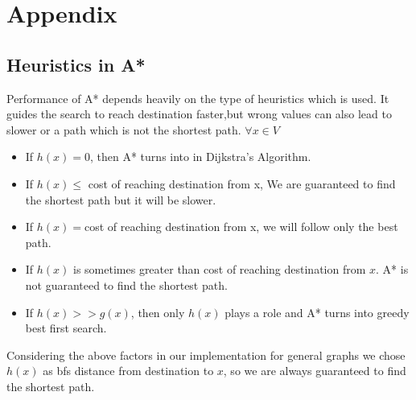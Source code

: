 \documentclass[a4paper]{article}
\begin{document}
    \section{Appendix} 
    \subsection{Heuristics in A*}
     Performance of A* depends heavily on the type of heuristics which is used. It guides the search to reach destination faster,but wrong values can also lead to slower or a path which is not the shortest path.
     $\forall x \in V$
     \begin{itemize}
         \item If $h(x)=0$, then A* turns into in Dijkstra's Algorithm.
         \item If $h(x) \leq$ cost of reaching destination from x, We are guaranteed to find the shortest path but it will be slower.
         \item If $h(x) = $cost of reaching destination from x, we will follow only the best path.
         \item If $h(x)$ is sometimes greater than cost of reaching destination from $x$. A* is not guaranteed to find the shortest path.
         \item If $h(x)>> g(x)$, then only $h(x)$ plays a role and A* turns into greedy best first search.
     \end{itemize}
    Considering the above factors in our implementation for general graphs we chose $h(x)$ as bfs distance from destination to $x$, so we are always guaranteed to find the shortest path.
    

\end{document}
